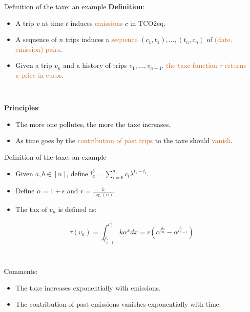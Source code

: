 \documentclass[french,english]{beamer}
\newcommand{\chocolate}[1]{\textcolor{chocolate}{#1}}
\begin{document}
\begin{frame}{Definition of the taxe: an example}
\textbf{Definition}:
\begin{itemize}
\item A trip $v$ at time $t$ induces \chocolate{emissions} $c$ in TCO2eq.
\item A sequence of $n$ trips induces a \chocolate{sequence} $(c_1,t_1),\ldots,(t_n,c_n)$ of \chocolate{(date, emission) pairs}.
\item Given a trip $v_n$ and a history of trips $v_1,\ldots, v_{n-1}$, \chocolate{the taxe function $\tau$ returns a price in euros}.  
\end{itemize}

\

\textbf{Principles}:
\begin{itemize}
\item The more one pollutes, the more the taxe increases. 
\item As time goes by the \chocolate{contribution of past trips} to the taxe should \chocolate{vanish}.
\end{itemize}
\end{frame}


\begin{frame}{Definition of the taxe: an example}
    \begin{itemize}
    \item Given $a,b \in [n]$, define $l_a^{b} = \sum_{i = 0}^a c_i \lambda^{t_b - t_i}$.
    \item Define $\alpha = 1 + \epsilon$ and $r = \frac{k}{\log(\alpha)}$.
    \item The tax of $v_n$ is defined as: \begin{tcolorbox}$$ \tau(v_n) = \int_{l_{n-1}^{t_n}}^{l_n^{t_n}} k \alpha^x dx = r (\alpha^{l_n^{t_n}} - \alpha^{l_{n - 1}^{t_n}}).$$\end{tcolorbox}
    \end{itemize}	
    
    \

   Comments:
   \begin{itemize}
   \item The taxe increases exponentially with emissions.
   \item The contribution of past emissions vanishes exponentially with time.
   \end{itemize}

\end{frame}
\end{document}
